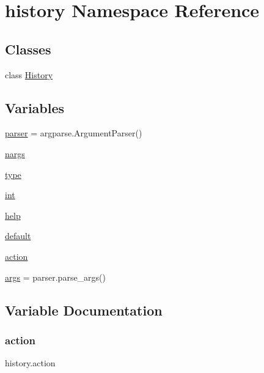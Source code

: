\hypertarget{namespacehistory}{}\section{history Namespace Reference}
\label{namespacehistory}
\subsection*{Classes}
\begin{DoxyCompactItemize}
\item 
class \hyperlink{classhistory_1_1History}{History}
\end{DoxyCompactItemize}
\subsection*{Variables}
\begin{DoxyCompactItemize}
\item 
\hyperlink{namespacehistory_a52ed202eef2f840fcd6959322b7ab460}{parser} = argparse.\+Argument\+Parser()
\item 
\hyperlink{namespacehistory_a978327a0c20cc065ff7864359bb8d216}{nargs}
\item 
\hyperlink{namespacehistory_a83a2419001ff099ae979da1aafb842fa}{type}
\item 
\hyperlink{namespacehistory_abedd814a9303d1b4a20326d67d233149}{int}
\item 
\hyperlink{namespacehistory_a83c3779ca5c2085f5aad321d7939590f}{help}
\item 
\hyperlink{namespacehistory_ae7689073c4f97a2fb2882f2567f807e0}{default}
\item 
\hyperlink{namespacehistory_a55fe756ef5920faa47da86dc00d3fb97}{action}
\item 
\hyperlink{namespacehistory_ab07fd329163b8a62f009a6fee1854dcd}{args} = parser.\+parse\+\_\+args()
\end{DoxyCompactItemize}


\subsection{Variable Documentation}
\mbox{\label{namespacehistory_a55fe756ef5920faa47da86dc00d3fb97}} 
\subsubsection{\texorpdfstring{action}{action}}
{\footnotesize\ttfamily history.\+action}

